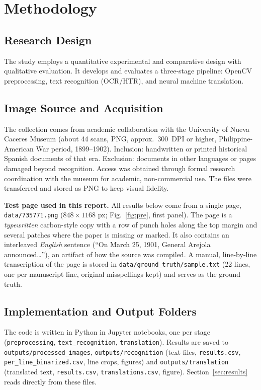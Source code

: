 \documentclass[10pt,twocolumn]{article}
\begin{document}
\section{Methodology}
\subsection{Research Design}
The study employs a quantitative experimental and comparative design with qualitative evaluation. It develops and evaluates a three-stage pipeline: OpenCV preprocessing, text recognition (OCR/HTR), and neural machine translation.

\subsection{Image Source and Acquisition}
The collection comes from academic collaboration with the University of Nueva Caceres Museum (about 44 scans, PNG, approx.\ 300~DPI or higher, Philippine-American War period, 1899--1902). Inclusion: handwritten or printed historical Spanish documents of that era. Exclusion: documents in other languages or pages damaged beyond recognition. Access was obtained through formal research coordination with the museum for academic, non-commercial use. The files were transferred and stored as PNG to keep visual fidelity.

\textbf{Test page used in this report.} All results below come from a single page, \texttt{data/735771.png} ($848\times1168$ px; Fig.~\ref{fig:pre}, first panel). The page is a \emph{typewritten} carbon-style copy with a row of punch holes along the top margin and several patches where the paper is missing or marked. It also contains an interleaved \emph{English} sentence (``On March 25, 1901, General Arejola announced\ldots''), an artifact of how the source was compiled. A manual, line-by-line transcription of the page is stored in \texttt{data/ground\_\allowbreak{}truth/sample.txt} (22 lines, one per manuscript line, original misspellings kept) and serves as the ground truth.

\subsection{Implementation and Output Folders}
The code is written in Python in Jupyter notebooks, one per stage (\texttt{preprocessing}, \texttt{text\_\allowbreak{}recognition}, \texttt{translation}). Results are saved to \texttt{outputs/processed\_\allowbreak{}images}, \texttt{outputs/recognition} (text files, \texttt{results.csv}, \texttt{per\_\allowbreak{}line\_\allowbreak{}binarized.csv}, line crops, figures) and \texttt{outputs/translation} (translated text, \texttt{results.csv}, \texttt{translations.csv}, figure). Section~\ref{sec:results} reads directly from these files.
\end{document}
